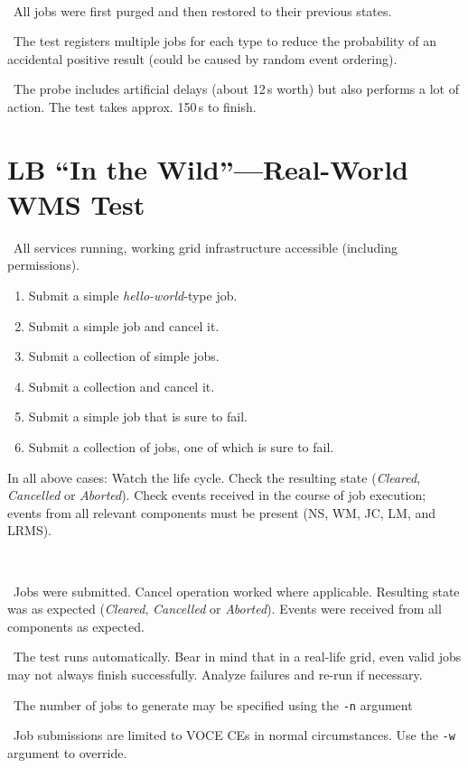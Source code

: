 \how\ 

\result\ All jobs were first purged and then restored to their previous states.

\note\ The test registers multiple jobs for each type to reduce the probability of an accidental positive result (could be caused by random event ordering).

\note\ The probe includes artificial delays (about 12\,s worth) but also performs a lot of action. The test takes approx. 150\,s to finish.

\section{LB ``In the Wild''---Real-World WMS Test}
\req\ All \LB services running, working grid infrastructure accessible (including permissions). 

\what
\begin{enumerate}
\item Submit a simple \emph{hello-world}-type job.
\item Submit a simple job and cancel it.
\item Submit a collection of simple jobs.
\item Submit a collection and cancel it. 
\item Submit a simple job that is sure to fail.
\item Submit a collection of jobs, one of which is sure to fail. 
\end{enumerate}

In all above cases: Watch the life cycle. Check the resulting state (\emph{Cleared}, \emph{Cancelled} or \emph{Aborted}). Check events received in the course of job execution; events from all relevant components must be present (NS, WM, JC, LM, and LRMS). 

\how\ 

\result\ Jobs were submitted. Cancel operation worked where applicable. Resulting state was as expected (\emph{Cleared}, \emph{Cancelled} or \emph{Aborted}). Events were received from all components as expected.

\note\ The test runs automatically. Bear in mind that in a real-life grid, even valid jobs may not always finish successfully. Analyze failures and re-run if necessary.

\note\ The number of jobs to generate may be specified using the \texttt{-n} argument

\note\ Job submissions are limited to VOCE CEs in normal circumstances. Use the \texttt{-w} argument to override. 

